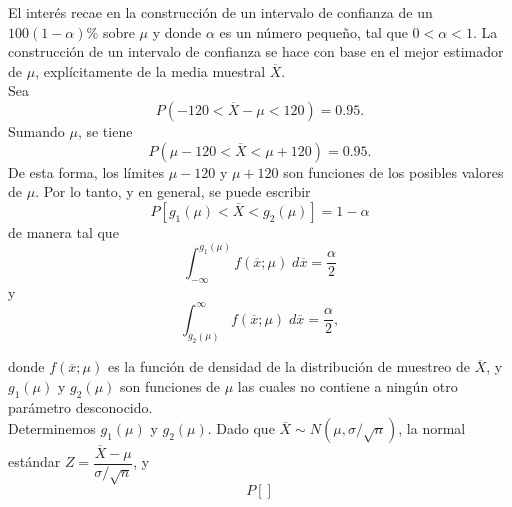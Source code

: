 El interés recae en la construcción de un intervalo de confianza de un $100(1-\alpha)\%$ sobre $\mu$ y donde $\alpha$ es un número pequeño, tal que $0<\alpha<1$. La construcción de un intervalo de confianza se hace con base en el mejor estimador de $\mu$, explícitamente de la media muestral $\overline{X}$.\\

Sea 
$$P(-120<\overline{X}-\mu<120)=0.95.$$
Sumando $\mu$, se tiene
$$P(\mu-120<\overline{X}<\mu+120)=0.95.$$
De esta forma, los límites $\mu-120$ y $\mu+120$ son funciones de los posibles valores de $\mu$. Por lo tanto, y en general, se puede escribir
$$P\left[g_1(\mu)<\overline{X}<g_2(\mu)\right]=1-\alpha$$
de manera tal que
$$\int_{-\infty}^{g_1(\mu)}f(\overline{x};\mu)\; d\overline{x}=\dfrac{\alpha}{2}$$
y
$$\int^{\infty}_{g_2(\mu)}f(\overline{x};\mu)\; d\overline{x}=\dfrac{\alpha}{2},$$

donde $f(\overline{x};\mu)$ es la función de densidad de la distribución de muestreo de $\overline{X}$, y $g_1(\mu)$ y $g_2(\mu)$ son funciones de $\mu$ las cuales no contiene a ningún otro parámetro desconocido.\\

Determinemos $g_1(\mu)$ y $g_2(\mu)$. Dado que $\overline{X}\sim N(\mu,\sigma/\sqrt{n})$, la normal estándar $Z=\dfrac{\overline{X}-\mu}{\sigma/\sqrt{n}}$, y 
$$P\left[\right]$$







